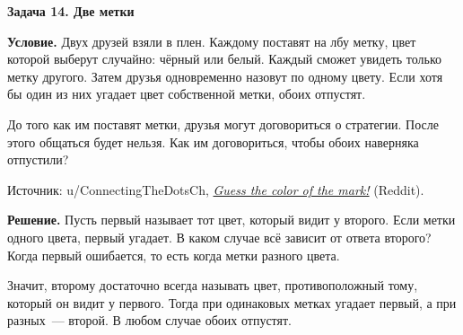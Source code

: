 \documentclass[a4paper,11pt]{article}
\begin{document}
\begin{center}
  {\large\bfseries Задача 14. Две метки}
\end{center}

\textbf{Условие.} Двух друзей взяли в плен. Каждому поставят на лбу метку,
цвет которой выберут случайно: чёрный или белый. Каждый сможет увидеть
только метку другого. Затем друзья одновременно назовут по одному цвету.
Если хотя бы один из них угадает цвет собственной метки, обоих отпустят.

До того как им поставят метки, друзья могут договориться о стратегии.
После этого общаться будет нельзя. Как им договориться, чтобы обоих
наверняка отпустили?

\smallskip
{\small Источник: u/ConnectingTheDotsCh,
\href{https://www.reddit.com/r/puzzles/comments/1y4jw6m/guess_the_color_of_the_mark/}{\emph{Guess the color of the mark!}} (Reddit).}

\clearpage

\textbf{Решение.} Пусть первый называет тот цвет, который видит у второго.
Если метки одного цвета, первый угадает. В каком случае всё зависит
от ответа второго? Когда первый ошибается, то есть когда метки разного цвета.

Значит, второму достаточно всегда называть цвет, противоположный тому,
который он видит у первого. Тогда при одинаковых метках угадает первый,
а при разных~--- второй. В любом случае обоих отпустят.
\end{document}
